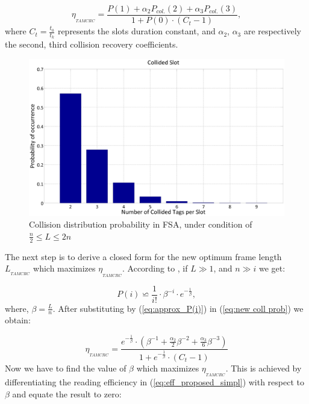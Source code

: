 \documentclass[10pt,conference,letterpaper]{RWWTemplate}
\begin{document}
{\scriptsize{}
\begin{equation}
\eta_{_{TAMCRC}}=\frac{P(1)+\alpha_{2}P_{col.}(2)+\alpha_{3}P_{col.}(3)}{1+P(0)\cdot(C_{t}-1)},\label{eq:new coll prob}
\end{equation}
}where $C_{t}=\frac{t_{0}}{t_{k}}$ represents the slots duration
constant, and $\alpha_{2}$, $\alpha_{3}$ are respectively the second,
third collision recovery coefficients. 
\begin{figure}
\includegraphics[width=1\columnwidth]{collision_distribution}

\protect\caption{Collision distribution probability in FSA, under condition of $\frac{n}{2}\leq L\leq2n$
\label{fig:Collision-distribution-in}}
\end{figure}


The next step is to derive a closed form for the new optimum frame
length $L_{_{TAMCRC}}$ which maximizes $\eta_{_{TAMCRC}}$. According
to \cite{2013_orthogonal}, if $L\gg1$, and $n\gg i$ we get:

{\scriptsize{}
\begin{equation}
P(i)\backsimeq\frac{1}{i!}\cdot\beta^{-i}\cdot e^{-\frac{1}{\beta}},\label{eq:approx_P(i)}
\end{equation}
}where, $\beta=\frac{L}{n}$. After substituting by (\ref{eq:approx_P(i)})
in (\ref{eq:new coll prob}) we obtain:

{\scriptsize{}
\begin{equation}
\eta_{_{TAMCRC}}=\frac{e^{-\frac{1}{\beta}}\cdot\left(\beta^{-1}+\frac{\alpha_{2}}{2}\beta^{-2}+\frac{\alpha_{3}}{6}\beta^{-3}\right)}{1+e^{-\frac{1}{\beta}}\cdot(C_{t}-1)}\label{eq:eff_proposed_simpl}
\end{equation}
}Now we have to find the value of $\beta$ which maximizes $\eta_{_{TAMCRC}}$.
This is achieved by differentiating the reading efficiency in (\ref{eq:eff_proposed_simpl})
with respect to $\beta$ and equate the result to zero:
\end{document}
